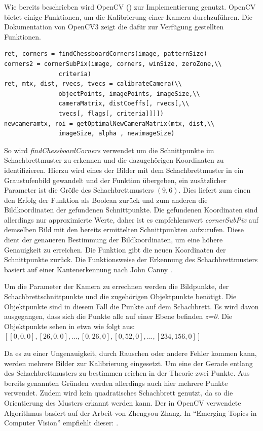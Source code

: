 Wie bereits beschrieben wird OpenCV () zur Implementierung genutzt. OpenCV bietet einige Funktionen, um die Kalibrierung einer Kamera durchzuführen. Die Dokumentation von OpenCV3 \autocite{Opencv3Camera2016} zeigt die dafür zur Verfügung gestellten Funktionen. 
\begin{lstlisting}[frame=single]
ret, corners = findChessboardCorners(image, patternSize) 
corners2 = cornerSubPix(image, corners, winSize, zeroZone,\\
               criteria) 
ret, mtx, dist, rvecs, tvecs = calibrateCamera(\\
               objectPoints, imagePoints, imageSize,\\
               cameraMatrix, distCoeffs[, rvecs[,\\
               tvecs[, flags[, criteria]]]]) 
newcameramtx, roi = getOptimalNewCameraMatrix(mtx, dist,\\
               imageSize, alpha , newimageSize)
\end{lstlisting}
So wird \textit{findChessboardCorners} verwendet um die Schnittpunkte im Schachbrettmuster zu erkennen und die dazugehörigen Koordinaten zu identifizieren. Hierzu wird eines der Bilder mit dem Schachbrettmuster in ein Graustufenbild gewandelt und der Funktion übergeben, ein zusätzlicher Parameter ist die Größe des Schachbrettmusters $(9,6)$. Dies liefert zum einen den Erfolg der Funktion als Boolean zurück und zum anderen die Bildkoordinaten der gefundenen Schnittpunkte. 
Die gefundenen Koordinaten sind allerdings nur approximierte Werte, daher ist es empfehlenswert \textit{cornerSubPix} auf demselben Bild mit den bereits ermittelten Schnittpunkten aufzurufen. Diese dient der genaueren Bestimmung der Bildkoordinaten, um eine höhere Genauigkeit zu erreichen. Die Funktion gibt die neuen Koordinaten der Schnittpunkte zurück. 
Die Funktionsweise der Erkennung des Schachbrettmusters basiert auf einer Kantenerkennung nach John Canny \autocite{canny1986}.

Um die Parameter der Kamera zu errechnen werden die Bildpunkte, der Schachbrettschnittpunkte und die zugehörigen Objektpunkte benötigt. Die Objektpunkte sind in diesem Fall die Punkte auf dem Schachbrett. Es wird davon ausgegangen, dass sich die Punkte alle auf einer Ebene befinden \textit{z=0}. Die Objektpunkte sehen in etwa wie folgt aus: $[[0,0,0], [26,0,0],...,[0,26,0],[0,52,0],...,[234,156,0]]$

Da es zu einer Ungenauigkeit, durch Rauschen oder andere Fehler kommen kann, werden mehrere Bilder zur Kalibrierung eingesetzt. Um eine der Gerade entlang des Schachbrettmusters zu bestimmen reichen in der Theorie zwei Punkte. Aus bereits genannten Gründen werden allerdings auch hier mehrere Punkte verwendet. Zudem wird kein quadratisches Schachbrett genutzt, da so die Orientierung des Musters erkannt werden kann. 
Der in OpenCV verwendete Algorithmus basiert auf der Arbeit von Zhengyou Zhang. In "`Emerging Topics in Computer Vision"' \autocite{Medioni:2004:ETC:993884} empfiehlt dieser:  \autocite[24]{Zhang2000}.


